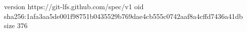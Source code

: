 version https://git-lfs.github.com/spec/v1
oid sha256:1afa3aa5de001f98751b0435529b769dae4cb555c0742aaf8a4cffd7436a41db
size 376
